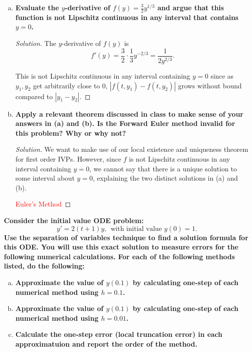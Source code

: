 \documentclass[11pt]{article}
\newenvironment{solution}
  {\renewcommand\qedsymbol{$\blacksquare$}\begin{proof}[Solution]}
  {\end{proof}}
\theoremstyle{definition}
\begin{document}
\begin{enumerate}
\begin{enumerate}[a)]
\begin{solution}
        Dividing both sides by $\frac{3}{2}$ and raising both sides to the power of $\frac{3}{2}$, we get the solution \[y = t^{\frac{3}{2}}.\]

        Since we do see that this solution satisfies the intial value $y(0) = 0$, we find that the solution to the IVP is $\boxed{y' = t^{\frac{3}{2}}}.$
        \end{solution}
        \item \textbf{Evaluate the $y$-derivative of $f(y) = \frac{3}{2}y^{1/3}$ and argue that this function is not Lipschitz continuous in any interval that contains $y=0$.}
        
        \begin{solution}
        The $y$-derivative of $f(y)$ is 
        \[ f'(y) = \frac{3}{2} \cdot \frac{1}{3} y^{-2/3} = \frac{1}{2y^{2/3}}.\]

        This is not Lipschitz continuous in any interval containing $y=0$ since as $y_1, y_2$ get arbitrarily close to $0$, $|f(t, y_1) - f(t, y_2)|$ grows without bound compared to $|y_1 - y_2|.$
        \end{solution}
        \item \textbf{Apply a relevant theorem discussed in class to make sense of your answers in (a) and (b). Is the Forward Euler method invalid for this problem? Why or why not?}
        \begin{solution}
        We want to make use of our local existence and uniqueness theorem for first order IVPs. However, since $f$ is not Lipschitz continuous in any interval containing $y=0$, we cannot say that there is a unique solution to some interval about $y=0$, explaining
        the two distinct solutions in (a) and (b). 

        \textcolor{red}{Euler's Method}
        \end{solution}
    \end{enumerate}

    \newpage

    \textbf{Consider the initial value ODE problem: \[y' = 2(t+1)y, \, \text{ with initial value } y(0) = 1.\] Use the separation of variables technique
    to find a solution formula for this ODE. You will use this exact solution to measure errors for the following numerical calculations. For each of the following methods listed, do the following:}

    \begin{enumerate}[a)]
        \item \textbf{Approximate the value of $y(0.1)$ by calculating one-step of each numerical method using $h = 0.1$.}
        \item \textbf{Approximate the value of $y(0.1)$ by calculating one-step of each numerical method using $h = 0.01$.}
        \item \textbf{Calculate the one-step error (local truncation error) in each approximatuion and report the order of the method.}
    \end{enumerate}


\end{enumerate}
\end{document}
